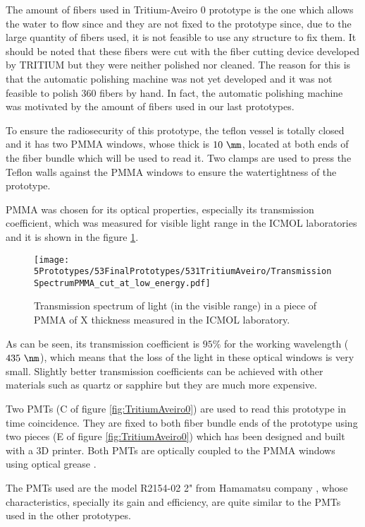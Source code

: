 The amount of fibers used in Tritium-Aveiro 0 prototype is the one which allows the water to flow since and they are not fixed to the prototype since, due to the large quantity of fibers used, it is not feasible to use any structure to fix them. It should be noted that these fibers were cut with the fiber cutting device developed by TRITIUM but they were neither polished nor cleaned. The reason for this is that the automatic polishing machine was not yet developed and it was not feasible to polish 360 fibers by hand. In fact, the automatic polishing machine was motivated by the amount of fibers used in our last prototypes.

To ensure the radiosecurity of this prototype, the teflon vessel is totally closed and it has two PMMA windows, whose thick is $10~\mm$, located at both ends of the fiber bundle which will be used to read it. Two clamps are used to press the Teflon walls against the PMMA windows to ensure the watertightness of the prototype.

PMMA was chosen for its optical properties, especially its transmission coefficient, which was measured for visible light range in the ICMOL laboratories and it is shown in the figure \ref{fig:PMMATransmissionSpectrum}.

\begin{figure}[h]
\centering
\texttt{[image: 5Prototypes/53FinalPrototypes/531TritiumAveiro/TransmissionSpectrumPMMA\_cut\_at\_low\_energy.pdf]}
\caption{Transmission spectrum of light (in the visible range) in a piece of PMMA of X thickness measured in the ICMOL laboratory. \label{fig:PMMATransmissionSpectrum}}
\end{figure}	

As can be seen, its transmission coefficient is $95\%$ for the working wavelength ($435~\nm$), which means that the loss of the light in these optical windows is very small. Slightly better transmission coefficients can be achieved with other materials such as quartz or sapphire but they are much more expensive.

Two PMTs (C of figure \ref{fig:TritiumAveiro0}) are used to read this prototype in time coincidence. They are fixed to both fiber bundle ends of the prototype using two pieces (E of figure \ref{fig:TritiumAveiro0}) which has been designed and built with a 3D printer. Both PMTs are optically coupled to the PMMA windows using optical grease \cite{OpticalGrease}.

The PMTs used are the model R2154-02 2" from Hamamatsu company \cite{DataSheetPMTsAveiro}, whose characteristics, specially its gain and efficiency, are quite similar to the PMTs used in the other prototypes.

